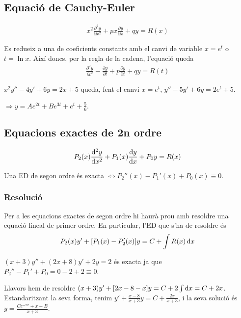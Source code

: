 \subsection{Equació de Cauchy-Euler}
\begin{defi}
\begin{align}
    x^{2} \frac{\partial^{2} y}{\partial x^{2}} + px \frac{\partial y}{\partial x} + qy = R(x)
\end{align}
\end{defi}
Es redueix a una de coeficients constants amb el canvi de variable $x= e^{t}$ o $t = \ln x$. Així doncs, per la regla de la cadena, l'equació queda
\begin{align}
    \frac{\partial^{2} y}{\partial t^{2}} - \frac{\partial y}{\partial t} + p \frac{\partial y}{\partial t} + qy = R(t)
\end{align}

\begin{example}
    $x^{2}y'' -4y' +6y = 2x + 5$ queda, fent el canvi $x = e^{t}$, $y'' -5 y' + 6y = 2e^{t} + 5$.

    $\displaystyle \Rightarrow \boxed{y = Ae^{2t} + Be^{3t} + e^{t} + \frac{5}{6}}$.
\end{example}

\subsection{Equacions exactes de 2n ordre}
\begin{defi}
    \begin{align}
        P_{2}(x) \frac{\mathrm{d}^{2} y}{\mathrm{d} x^{2}} + P_{1}(x) \frac{\mathrm{d} y}{\mathrm{d} x} + P_{0} y = R(x)
    \end{align}
\end{defi}
\begin{thm}
    Una ED de segon ordre és exacta $\Leftrightarrow P_{2}''(x) - P_{1}'(x) + P_{0}(x) \equiv 0$.
\end{thm}
\subsubsection*{Resolució}
Per a les equacions exactes de segon ordre hi haurà prou amb resoldre una equació lineal de primer ordre. En particular, l'ED que s'ha de resoldre és
\begin{align}
    P_{2}(x)y' + [P_{1}(x) - P_{2}'(x)] y = C + \int R(x) \mathop{}\!\mathrm{d} x
\end{align}
\begin{example}
    $(x+3) y'' + (2x+8) y' + 2y = 2$ és exacta ja que $P_{2}'' - P_{1}' + P_{0} = 0 -2 +2 \equiv 0$.

    Llavors hem de resoldre $(x+3) y' + [2x-8-x]y = C + 2 \int \mathop{}\!\mathrm{d} x = C + 2x$. Estandaritzant la seva forma, tenim $\displaystyle y' + \frac{x-8}{x+3} y = C + \frac{2x}{x+3}$, i la seva solució és $\boxed{y = \frac{C e^{-2x} + x + B}{x+3}}$.
\end{example}

